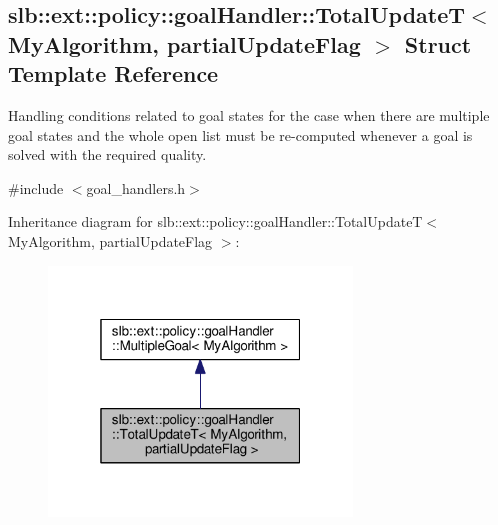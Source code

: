 \hypertarget{structslb_1_1ext_1_1policy_1_1goalHandler_1_1TotalUpdateT}{}\subsection{slb\+:\+:ext\+:\+:policy\+:\+:goal\+Handler\+:\+:Total\+UpdateT$<$ My\+Algorithm, partial\+Update\+Flag $>$ Struct Template Reference}
\label{structslb_1_1ext_1_1policy_1_1goalHandler_1_1TotalUpdateT}


Handling conditions related to goal states for the case when there are multiple goal states and the whole open list must be re-\/computed whenever a goal is solved with the required quality.  




{\ttfamily \#include $<$goal\+\_\+handlers.\+h$>$}



Inheritance diagram for slb\+:\+:ext\+:\+:policy\+:\+:goal\+Handler\+:\+:Total\+UpdateT$<$ My\+Algorithm, partial\+Update\+Flag $>$\+:\nopagebreak
\begin{figure}[H]
\begin{center}
\leavevmode
\includegraphics[width=229pt]{structslb_1_1ext_1_1policy_1_1goalHandler_1_1TotalUpdateT__inherit__graph}
\end{center}
\end{figure}


